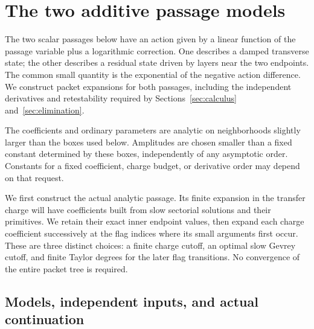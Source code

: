 \section{The two additive passage models}\label{sec:additive}

The two scalar passages below have an action given by a linear function
of the passage variable plus a logarithmic correction.  One describes
a damped transverse state; the other describes a residual state driven by layers near the two
endpoints.  The common small quantity is the exponential of the negative
action difference.  We construct packet expansions for both passages,
including the independent derivatives and retestability required by
Sections~\ref{sec:calculus} and~\ref{sec:elimination}.

The coefficients and ordinary parameters are analytic on neighborhoods
slightly larger than the boxes used below.  Amplitudes are chosen smaller
than a fixed constant determined by these boxes, independently of any
asymptotic order.  Constants for a fixed coefficient, charge budget, or
derivative order may depend on that request.

We first construct the actual analytic passage.  Its finite expansion in
the transfer charge will have coefficients built from slow sectorial
solutions and their primitives.  We retain their exact inner endpoint
values, then expand each charge coefficient successively at the flag
indices where its small arguments first occur.  These are three distinct
choices: a finite charge cutoff, an optimal slow Gevrey cutoff, and finite
Taylor degrees for the later flag transitions.  No convergence of the
entire packet tree is required.

\subsection{Models, independent inputs, and actual continuation}


